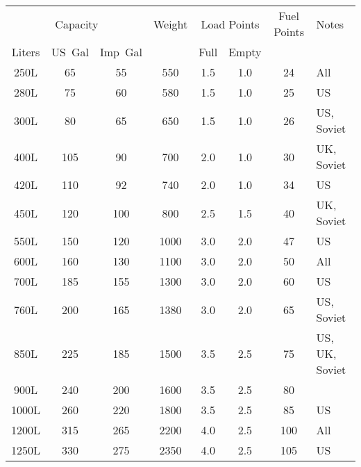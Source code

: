 \begin{twocolumntablefloat}
\begin{twocolumntable}
{
\begin{tabular}{cccccccl}
\toprule
\multicolumn{3}{c}{Capacity}&
Weight&
\multicolumn{2}{c}{Load Points}&
Fuel Points&
Notes\\
\cmidrule{1-3}
\cmidrule{5-6}
Liters&US~Gal&Imp~Gal&&Full&Empty&&\\
\midrule
\phantom{00}250L&\phantom{00}65&\phantom{00}55&\phantom{00}550&\phantom{0}1.5&\phantom{0}1.0&\phantom{0}24&All\\
\phantom{00}280L&\phantom{00}75&\phantom{00}60&\phantom{00}580&\phantom{0}1.5&\phantom{0}1.0&\phantom{0}25&US\\
\phantom{00}300L&\phantom{00}80&\phantom{00}65&\phantom{00}650&\phantom{0}1.5&\phantom{0}1.0&\phantom{0}26&US, Soviet\\
\phantom{00}400L&\phantom{0}105&\phantom{00}90&\phantom{00}700&\phantom{0}2.0&\phantom{0}1.0&\phantom{0}30&UK, Soviet\\
\phantom{00}420L&\phantom{0}110&\phantom{00}92&\phantom{00}740&\phantom{0}2.0&\phantom{0}1.0&\phantom{0}34&US\\
\phantom{00}450L&\phantom{0}120&\phantom{0}100&\phantom{00}800&\phantom{0}2.5&\phantom{0}1.5&\phantom{0}40&UK, Soviet\\
\phantom{00}550L&\phantom{0}150&\phantom{0}120&\phantom{0}1000&\phantom{0}3.0&\phantom{0}2.0&\phantom{0}47&US\\
\phantom{00}600L&\phantom{0}160&\phantom{0}130&\phantom{0}1100&\phantom{0}3.0&\phantom{0}2.0&\phantom{0}50&All\\
\phantom{00}700L&\phantom{0}185&\phantom{0}155&\phantom{0}1300&\phantom{0}3.0&\phantom{0}2.0&\phantom{0}60&US\\
\phantom{00}760L&\phantom{0}200&\phantom{0}165&\phantom{0}1380&\phantom{0}3.0&\phantom{0}2.0&\phantom{0}65&US, Soviet\\
\phantom{00}850L&\phantom{0}225&\phantom{0}185&\phantom{0}1500&\phantom{0}3.5&\phantom{0}2.5&\phantom{0}75&US, UK, Soviet\\
\phantom{00}900L&\phantom{0}240&\phantom{0}200&\phantom{0}1600&\phantom{0}3.5&\phantom{0}2.5&\phantom{0}80&\\
\phantom{0}1000L&\phantom{0}260&\phantom{0}220&\phantom{0}1800&\phantom{0}3.5&\phantom{0}2.5&\phantom{0}85&US\\
\phantom{0}1200L&\phantom{0}315&\phantom{0}265&\phantom{0}2200&\phantom{0}4.0&\phantom{0}2.5&\phantom{}100&All\\
\phantom{0}1250L&\phantom{0}330&\phantom{0}275&\phantom{0}2350&\phantom{0}4.0&\phantom{0}2.5&\phantom{}105&US\\

\end{tabular}}
\end{twocolumntable}
\end{twocolumntablefloat}

